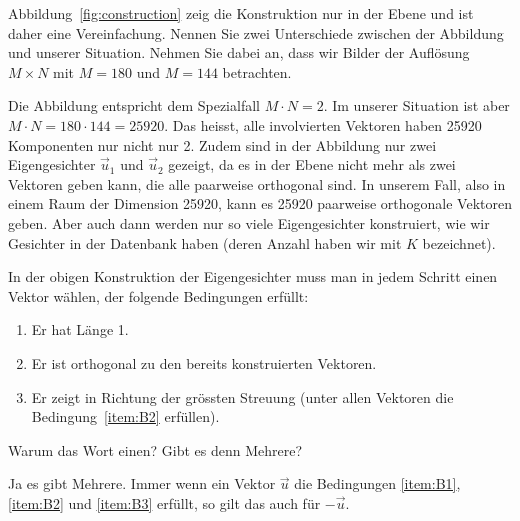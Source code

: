 \begin{aufgabe} \label{aufg:eigenface_construction_0}
	Abbildung~\ref{fig:construction} zeig die Konstruktion nur in der Ebene und ist daher eine Vereinfachung.
	Nennen Sie zwei Unterschiede zwischen der Abbildung und unserer Situation.
	Nehmen Sie dabei an, dass wir Bilder der Auflösung $M\times N$ mit $M=180$ und $M=144$ betrachten.
\end{aufgabe}
\begin{losung}
	Die Abbildung entspricht dem Spezialfall $M\cdot N=2$.
	Im unserer Situation ist aber $M\cdot N=180\cdot 144=25920$.
	Das heisst, alle involvierten Vektoren haben 25920 Komponenten nur nicht nur 2.
	Zudem sind in der Abbildung nur zwei Eigengesichter $\vec u_1$ und $\vec u_2$ gezeigt, da es in der Ebene nicht mehr als zwei Vektoren geben kann, die alle paarweise orthogonal sind.
	In unserem Fall, also in einem Raum der Dimension 25920, kann es 25920 paarweise orthogonale Vektoren geben.
	Aber auch dann werden nur so viele Eigengesichter konstruiert, wie wir Gesichter in der Datenbank haben (deren Anzahl haben wir mit $K$ bezeichnet).
\end{losung}

\begin{aufgabe} \label{aufg:eigenface_construction_1}
	In der obigen Konstruktion der Eigengesichter muss man in jedem Schritt \glqq{}einen\grqq{} Vektor wählen, der folgende Bedingungen erfüllt:
	\begin{enumerate}[label=(\alph*)]
		\item \label{item:B1} Er hat Länge 1.
		\item \label{item:B2} Er ist orthogonal zu den bereits konstruierten Vektoren.
		\item\label{item:B3} Er zeigt in Richtung der grössten Streuung (unter allen Vektoren die Bedingung~\ref{item:B2} erfüllen).
	\end{enumerate}
	Warum das Wort \glqq{}einen\grqq{}?
	Gibt es denn Mehrere?
\end{aufgabe}
\begin{losung}
	Ja es gibt Mehrere.
	Immer wenn ein Vektor $\vec u$ die Bedingungen \ref{item:B1}, \ref{item:B2} und \ref{item:B3} erfüllt, so gilt das auch für $-\vec u$.
\end{losung}

